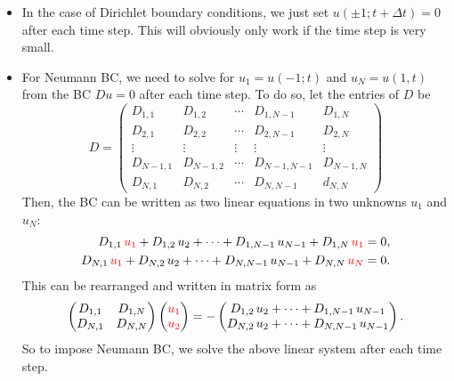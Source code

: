 \documentclass[11pt]{article}
\begin{document}
\begin{itemize}
  \item In the case of Dirichlet boundary conditions, we just set $u(\pm 1; t + \Delta t ) = 0$ after each time step.
    This will obviously only work if the time step is very small.

  \item For Neumann BC, we need to solve for $u_{1} = u(-1; t)$ and $u_{N} = u(1, t)$ from the BC $Du = 0$ after each time step.
    To do so, let the entries of $D$ be
  \begin{equation}
    D = 
    \begin{pmatrix}
      D_{1,1} & D_{1,2} & \cdots & D_{1,N-1} & D_{1,N}\\
      D_{2,1} & D_{2,2} & \cdots & D_{2,N-1} & D_{2,N}\\
      \vdots & \vdots & \vdots & \vdots & \vdots\\
      D_{N-1,1} & D_{N-1,2} & \cdots & D_{N-1,N-1} & D_{N-1,N}\\
      D_{N,1} & D_{N,2} & \cdots & D_{N,N-1} & d_{N,N}
    \end{pmatrix}
  \end{equation}
  Then, the BC can be written as two linear equations in two unknowns $u_{1}$ and $u_{N}$:
  \begin{equation}
    \begin{aligned}
      D_{1,1}\,{\color{red}u_{1}} + D_{1,2}\,u_{2} + \cdots + D_{1,N-1}\,u_{N-1} + D_{1,N}\,{\color{red}u_{1}} &= 0,\\
      D_{N,1}\,{\color{red}u_{1}} + D_{N,2}\,u_{2} + \cdots + D_{N,N-1}\,u_{N-1} + D_{N,N}\,{\color{red}u_{N}} &= 0.
    \end{aligned}
  \end{equation}
  This can be rearranged and written in matrix form as
  \begin{equation}
    \begin{pmatrix}
      D_{1,1} & D_{1,N}\\
      D_{N,1} & D_{N,N}\\
    \end{pmatrix}
    \begin{pmatrix}
      \color{red}
      u_{1}\\
      \color{red}
      u_{2}
    \end{pmatrix}
    =
    -
    \begin{pmatrix}
      D_{1,2}\,u_{2} + \cdots + D_{1,N-1}\,u_{N-1}\\
      D_{N,2}\,u_{2} + \cdots + D_{N,N-1}\,u_{N-1}
    \end{pmatrix}.
  \end{equation}
  So to impose Neumann BC, we solve the above linear system after each time step.


\end{itemize}
\end{document}
